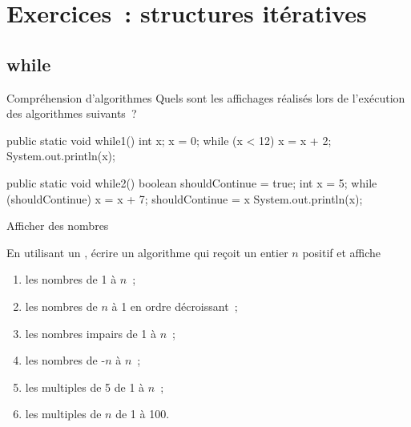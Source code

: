 \clearpage 
\section{Exercices~: structures itératives}

\subsection{while}
\bigskip 

	\begin{Exercice}{Compréhension d’algorithmes}
		Quels sont les affichages réalisés lors de l’exécution
		des algorithmes suivants~?

		\begin{java}
public static void while1(){
	int x;
	x = 0;
	while (x < 12){
		x = x + 2;
	}
	System.out.println(x);
}
		\end{java}

		\begin{java}
public static void while2(){
	boolean shouldContinue = true;
	int x = 5;
	while (shouldContinue) {
		x = x + 7;
		shouldContinue = x %
	}
	System.out.println(x);
}
		\end{java}


	\end{Exercice}

		\begin{Exercice}{Afficher des nombres}

			En utilisant un \pc{\algorithmicwhile},
			écrire un algorithme qui reçoit un entier $n$ positif et affiche
			\begin{enumerate}[label=\alph*)]
				\item les nombres de 1 à $n$~;
				\item les nombres de $n$ à 1 en ordre décroissant~;
				\item les nombres impairs de 1 à $n$~;
				\item les nombres de -$n$ à $n$~;
				\item les multiples de 5 de 1 à $n$~;
				\item les multiples de $n$ de 1 à 100.
			\end{enumerate}
		\end{Exercice}




